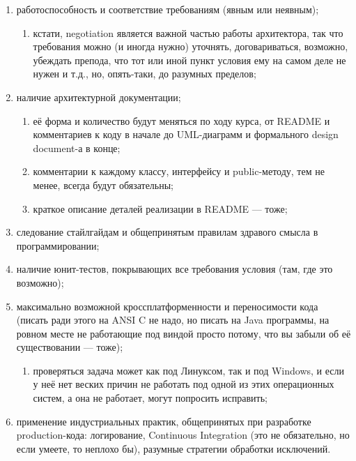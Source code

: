 \documentclass[a5paper]{article}
\begin{document}
\begin{enumerate}
	\item работоспособность и соответствие требованиям (явным или неявным);
  \begin{enumerate}
		\item кстати, negotiation является важной частью работы архитектора, так что требования можно (и иногда нужно) уточнять, договариваться, возможно, убеждать препода, что тот или иной пункт условия ему на самом деле не нужен и т.д., но, опять-таки, до разумных пределов;
  \end{enumerate}
	\item наличие архитектурной документации;
  \begin{enumerate}
		\item её форма и количество будут меняться по ходу курса, от README и комментариев к коду в начале до UML-диаграмм и формального design document-а в конце;
		\item комментарии к каждому классу, интерфейсу и public-методу, тем не менее, всегда будут обязательны;
		\item краткое описание деталей реализации в README --- тоже;
  \end{enumerate}
	\item следование стайлгайдам и общепринятым правилам здравого смысла в программировании;
	\item наличие юнит-тестов, покрывающих все требования условия (там, где это возможно);
	\item максимально возможной кроссплатформенности и переносимости кода (писать ради этого на ANSI C не надо, но писать на Java программы, на ровном месте не работающие под виндой просто потому, что вы забыли об её существовании --- тоже);
  \begin{enumerate}
		\item проверяться задача может как под Линуксом, так и под Windows, и если у неё нет веских причин не работать под одной из этих операционных систем, а она не работает, могут попросить исправить;
  \end{enumerate}
	\item применение индустриальных практик, общепринятых при разработке production-кода: логирование, Continuous Integration (это не обязательно, но если умеете, то неплохо бы), разумные стратегии обработки исключений.
\end{enumerate}
\end{document}
